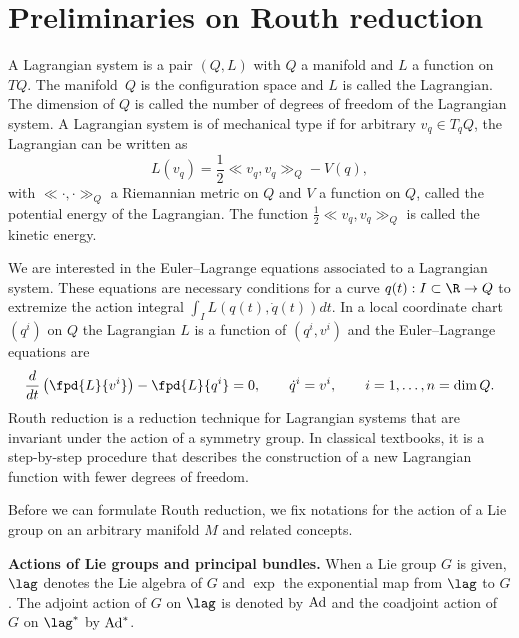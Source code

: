 \section{Preliminaries on Routh reduction}\label{section2}

\begin{definition} A Lagrangian system is a pair $(Q,L)$ with $Q$ a manifold and $L$ a function on~$TQ$. The manifold~$Q$ is the conf\/iguration space and $L$ is called the Lagrangian. The dimension of $Q$ is called the number of degrees of freedom of the Lagrangian system.  A Lagrangian system is of mechanical type if for arbitrary $v_q\in T_qQ$, the Lagrangian can be written as \[L(v_q) = \frac12 \ll v_q,v_q\gg_Q-V(q),\] with $\ll\cdot,\cdot\gg_Q$ a Riemannian metric on $Q$ and $V$ a function on $Q$, called the potential energy of the Lagrangian. The function $\frac12\ll v_q,v_q\gg_Q$ is called the kinetic energy.
\end{definition}

We are interested in the Euler--Lagrange equations associated to a Lagrangian system. These equations are necessary conditions for a curve $q(t):I\subset \R \to Q$ to extremize the action integral $\int_I L(q(t), \dot q(t)) dt$. In a local coordinate chart $(q^i)$  on $Q$ the Lagrangian $L$ is a function of $(q^i,v^i)$ and the Euler--Lagrange equations are
\[
\frac{d}{dt} \left(\fpd{L}{v^i} \right) - \fpd{L}{q^i} = 0, \qquad \dot q^i =v^i, \qquad i=1,\ldots, n=\dim Q.
\]
Routh reduction is a reduction technique for Lagrangian systems that are invariant under the action of a symmetry group. In classical textbooks, it is a step-by-step procedure that describes the construction of a new Lagrangian function with fewer degrees of freedom.

Before we can formulate Routh reduction, we f\/ix notations for the action of a Lie group on an arbitrary manifold $M$ and related concepts.

{\bf Actions of Lie groups and principal bundles.}  When a Lie group $G$ is given,  $\lag$ denotes the Lie algebra of $G$ and $\exp$ the exponential map from $\lag$ to $G$. The adjoint action of $G$ on $\lag$ is denoted by ${\rm Ad}$ and the coadjoint action of $G$ on $\lag^*$ by ${\rm Ad}^*$.

